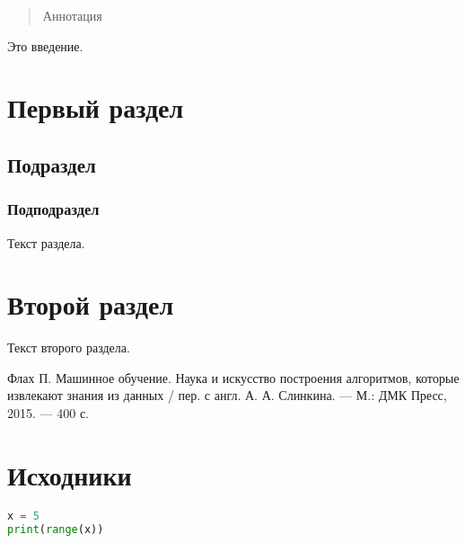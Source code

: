 \documentclass{amcs}
\begin{document}
\setfemale
{}
\maketitlepage

\begin{abstract}
  Аннотация
\end{abstract}

\tableofcontents

Это введение.


\section{Первый раздел}
\subsection{Подраздел}
\subsubsection{Подподраздел}
Текст раздела.

\section{Второй раздел}
Текст второго раздела.



\begin{thebibliography}{99}
  Флах П.
  Машинное обучение. Наука и искусство построения алгоритмов, которые
  извлекают знания из данных / пер. с англ. А. А. Слинкина. --- М.: ДМК Пресс,
  2015. --- 400 с.
\end{thebibliography}

\appendix

\section{Исходники}
\begin{lstlisting}[language=Python]
x = 5
print(range(x))
\end{lstlisting}
\end{document}
